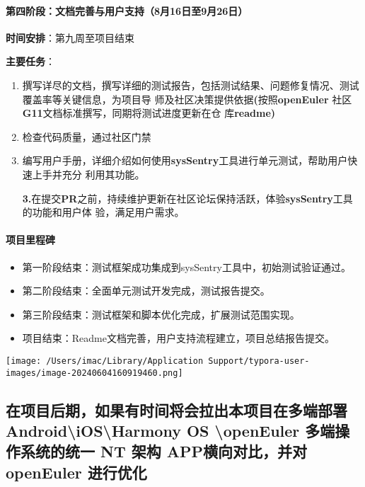 \documentclass[
]{article}
\begin{document}
\paragraph{第四阶段：文档完善与用户支持（8月16日至9月26日）}\label{ux7b2cux56dbux9636ux6bb5ux6587ux6863ux5b8cux5584ux4e0eux7528ux6237ux652fux63018ux670816ux65e5ux81f39ux670826ux65e5uxff09}

\textbf{时间安排}：第九周至项目结束

\textbf{主要任务}：

\begin{enumerate}
\def\labelenumi{\arabic{enumi}.}
\item
  撰写详尽的文档，撰写详细的测试报告，包括测试结果、问题修复情况、测试覆盖率等关键信息，为项目导
  师及社区决策提供依据\textbf{(}按照\textbf{openEuler}
  社区\textbf{G11}文档标准撰写，同期将测试进度更新在仓
  库\textbf{readme)}
\item
  检查代码质量，通过社区门禁
\item
  编写用户手册，详细介绍如何使用\textbf{sysSentry}工具进行单元测试，帮助用户快速上手并充分
  利用其功能。

  \textbf{3.}在提交\textbf{PR}之前，持续维护更新在社区论坛保持活跃，体验\textbf{sysSentry}工具的功能和用户体
  验，满足用户需求。
\end{enumerate}

\paragraph{项目里程碑}\label{ux9879ux76eeux91ccux7a0bux7891}

\begin{itemize}
\item
  第一阶段结束：测试框架成功集成到sysSentry工具中，初始测试验证通过。
\item
  第二阶段结束：全面单元测试开发完成，测试报告提交。
\item
  第三阶段结束：测试框架和脚本优化完成，扩展测试范围实现。
\item
  项目结束：Readme文档完善，用户支持流程建立，项目总结报告提交。
\end{itemize}

\texttt{[image: /Users/imac/Library/Application Support/typora-user-images/image-20240604160919460.png]}

\subsection{在项目后期，如果有时间将会拉出本项目在多端部署Android\textbackslash iOS\textbackslash Harmony
OS \textbackslash openEuler 多端操作系统的统一 NT 架构
APP横向对比，并对openEuler
进行优化}\label{ux5728ux9879ux76eeux540eux671fux5982ux679cux6709ux65f6ux95f4ux5c06ux4f1aux62c9ux51faux672cux9879ux76eeux5728ux591aux7aefux90e8ux7f72androidiosharmony-os-openeuler-ux591aux7aefux64cdux4f5cux7cfbux7edfux7684ux7edfux4e00-nt-ux67b6ux6784-appux6a2aux5411ux5bf9ux6bd4ux5e76ux5bf9openeuler-ux8fdbux884cux4f18ux5316}
\end{document}
